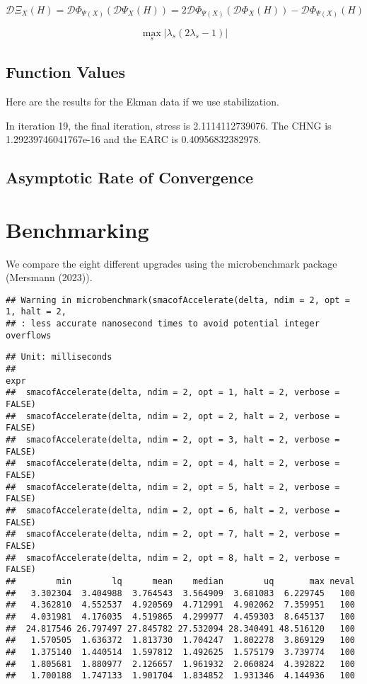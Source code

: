 \documentclass[
  12pt,
]{article}
\begin{document}
\[
\mathcal{D}\Xi_X(H)=\mathcal{D}\Phi_{\Psi(X)}(\mathcal{D}\Psi_X(H))=2\mathcal{D}\Phi_{\Psi(X)}(\mathcal{D}\Phi_X(H))-\mathcal{D}\Phi_{\Psi(X)}(H)
\]

\begin{equation}
\max_s|\lambda_s(2\lambda_s-1)|
\end{equation}

\subsection{Function Values}\label{function-values-6}

Here are the results for the Ekman data if we use stabilization.

In iteration 19, the final iteration, stress is 2.1114112739076. The CHNG is 1.29239746041767e-16 and the EARC is 0.40956832382978.

\subsection{Asymptotic Rate of Convergence}\label{asymptotic-rate-of-convergence-7}

\section{Benchmarking}\label{benchmarking}

We compare the eight different upgrades using the microbenchmark package (Mersmann (2023)).

\begin{verbatim}
## Warning in microbenchmark(smacofAccelerate(delta, ndim = 2, opt = 1, halt = 2,
## : less accurate nanosecond times to avoid potential integer overflows
\end{verbatim}

\begin{verbatim}
## Unit: milliseconds
##                                                                   expr
##  smacofAccelerate(delta, ndim = 2, opt = 1, halt = 2, verbose = FALSE)
##  smacofAccelerate(delta, ndim = 2, opt = 2, halt = 2, verbose = FALSE)
##  smacofAccelerate(delta, ndim = 2, opt = 3, halt = 2, verbose = FALSE)
##  smacofAccelerate(delta, ndim = 2, opt = 4, halt = 2, verbose = FALSE)
##  smacofAccelerate(delta, ndim = 2, opt = 5, halt = 2, verbose = FALSE)
##  smacofAccelerate(delta, ndim = 2, opt = 6, halt = 2, verbose = FALSE)
##  smacofAccelerate(delta, ndim = 2, opt = 7, halt = 2, verbose = FALSE)
##  smacofAccelerate(delta, ndim = 2, opt = 8, halt = 2, verbose = FALSE)
##        min        lq      mean    median        uq       max neval
##   3.302304  3.404988  3.764543  3.564909  3.681083  6.229745   100
##   4.362810  4.552537  4.920569  4.712991  4.902062  7.359951   100
##   4.031981  4.176035  4.519865  4.299977  4.459303  8.645137   100
##  24.817546 26.797497 27.845782 27.532094 28.340491 48.516120   100
##   1.570505  1.636372  1.813730  1.704247  1.802278  3.869129   100
##   1.375140  1.440514  1.597812  1.492625  1.575179  3.739774   100
##   1.805681  1.880977  2.126657  1.961932  2.060824  4.392822   100
##   1.700188  1.747133  1.901704  1.834852  1.931346  4.144936   100
\end{verbatim}
\end{document}

